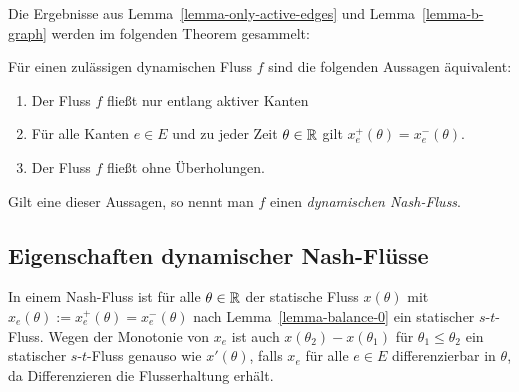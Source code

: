 Die Ergebnisse aus Lemma~\ref{lemma-only-active-edges} und Lemma~\ref{lemma-b-graph} werden im folgenden Theorem gesammelt:

\begin{theorem}\label{thm-equivalencies-nash-flow}
	Für einen zulässigen dynamischen Fluss $f$ sind die folgenden Aussagen äquivalent:
	\begin{enumerate}[label=(\roman*)]
		\item Der Fluss $f$ fließt nur entlang aktiver Kanten
		\item Für alle Kanten $e\in E$ und zu jeder Zeit $\theta\in\mathbb{R}$ gilt $x_e^+(\theta) = x_e^-(\theta)$.
		\item Der Fluss $f$ fließt ohne Überholungen.
	\end{enumerate}
	Gilt eine dieser Aussagen, so nennt man $f$ einen \emph{dynamischen Nash-Fluss}.
\end{theorem}

\subsection{Eigenschaften dynamischer Nash-Flüsse}

\begin{remark}\label{remark-s-t-flow}
	In einem Nash-Fluss ist für alle $\theta\in\mathbb{R}$ der statische Fluss $x(\theta)$ mit $x_e(\theta):=x_e^+(\theta)=x_e^-(\theta)$ nach Lemma~\ref{lemma-balance-0} ein statischer $s$-$t$-Fluss.
	Wegen der Monotonie von $x_e$ ist auch $x(\theta_2) - x(\theta_1)$ für $\theta_1 \leq \theta_2$ ein statischer $s$-$t$-Fluss genauso wie $x'(\theta)$, falls $x_e$ für alle $e\in E$ differenzierbar in $\theta$, da Differenzieren die Flusserhaltung erhält.
\end{remark}

